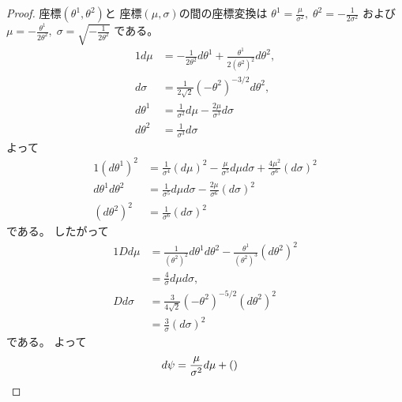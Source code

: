 \documentclass[report]{jlreq}
\begin{document}
\begin{proof}
    座標$(\theta^1, \theta^2)$と
    座標$(\mu, \sigma)$の間の座標変換は
    $\theta^1 = \frac{\mu}{\sigma^2}, \;
        \theta^2 = -\frac{1}{2 \sigma^2}$
    および
    $\mu = -\frac{\theta^1}{2\theta^2}, \;
        \sigma = \sqrt{-\frac{1}{2\theta^2}}$
    である。
    \begin{alignat}{1}
        d\mu
            &=
                - \frac{1}{2\theta^2} d\theta^1
                + \frac{\theta^1}{2(\theta^2)^2} d\theta^2,
                \\
        d\sigma
            &=
                \frac{1}{2\sqrt{2}} (-\theta^2)^{-3/2} d\theta^2,
                \\
        d\theta^1
            &=
                \frac{1}{\sigma^2} d\mu
                - \frac{2\mu}{\sigma^3} d\sigma
                \\
        d\theta^2
            &=
                \frac{1}{\sigma^3} d\sigma
    \end{alignat}
    よって
    \begin{alignat}{1}
        (d\theta^1)^2
            &=
                \frac{1}{\sigma^4} (d\mu)^2
                - \frac{\mu}{\sigma^5} d\mu d\sigma
                + \frac{4\mu^2}{\sigma^6} (d\sigma)^2
                \\
        d\theta^1 d\theta^2
            &=
                \frac{1}{\sigma^5} d\mu d\sigma
                - \frac{2\mu}{\sigma^6} (d\sigma)^2
                \\
        (d\theta^2)^2
            &=
                \frac{1}{\sigma^6} (d\sigma)^2
    \end{alignat}
    である。
    したがって
    \begin{alignat}{1}
        Dd\mu
            &=
                \frac{1}{(\theta^2)^2} d\theta^1 d\theta^2
                - \frac{\theta^1}{(\theta^2)^3} (d\theta^2)^2
                \\
            &=
                \frac{4}{\sigma} d\mu d\sigma,
                \\
        Dd\sigma
            &=
                \frac{3}{4\sqrt{2}} (-\theta^2)^{-5/2} (d\theta^2)^2
                \\
            &=
                \frac{3}{\sigma} (d\sigma)^2
    \end{alignat}
    である。
    よって
    \begin{alignat}{1}
        d\psi
            &=
                \frac{\mu}{\sigma^2}
                d\mu
                + \left({
}\right)
\end{alignat}
\end{proof}
\end{document}
